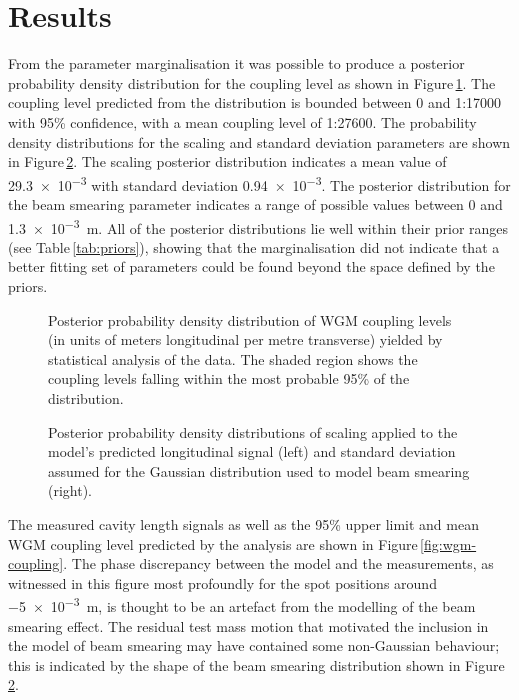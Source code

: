 \section{Results}
\label{sec:summary}
From the parameter marginalisation it was possible to produce a posterior probability density distribution for the coupling level as shown in Figure\,\ref{fig:wgm-coupling-prob}. The coupling level predicted from the distribution is bounded between 0 and 1:17000 with 95\% confidence, with a mean coupling level of 1:27600. The probability density distributions for the scaling and standard deviation parameters are shown in Figure\,\ref{fig:posterior-aux}. The scaling posterior distribution indicates a mean value of \num{29.3e-3} with standard deviation \num{0.94e-3}. The posterior distribution for the beam smearing parameter indicates a range of possible values between \num{0} and \SI{1.3e-3}{\meter}. All of the posterior distributions lie well within their prior ranges (see Table\,\ref{tab:priors}), showing that the marginalisation did not indicate that a better fitting set of parameters could be found beyond the space defined by the priors.

\begin{figure}
  \centering
  
  \caption[Posterior probability density distribution of the waveguide mirror coupling levels]{\label{fig:wgm-coupling-prob}Posterior probability density distribution of \gls{WGM} coupling levels (in units of meters longitudinal per metre transverse) yielded by statistical analysis of the data. The shaded region shows the coupling levels falling within the most probable 95\% of the distribution.}
\end{figure}

\begin{figure}
  \centering
  
  \caption[Posterior probability density distributions of scaling and spot position standard deviation factors applied to the waveguide model]{\label{fig:posterior-aux}Posterior probability density distributions of scaling applied to the model's predicted longitudinal signal (left) and standard deviation assumed for the Gaussian distribution used to model beam smearing (right).}
\end{figure}

The measured cavity length signals as well as the 95\% upper limit and mean \gls{WGM} coupling level predicted by the analysis are shown in Figure\,\ref{fig:wgm-coupling}. The phase discrepancy between the model and the measurements, as witnessed in this figure most profoundly for the spot positions around \SI{-5e-3}{\meter}, is thought to be an artefact from the modelling of the beam smearing effect. The residual test mass motion that motivated the inclusion in the model of beam smearing may have contained some non-Gaussian behaviour; this is indicated by the shape of the beam smearing distribution shown in Figure\,\ref{fig:posterior-aux}.

